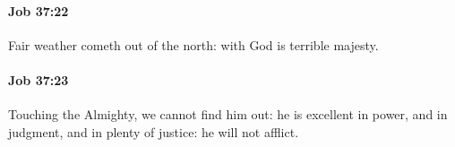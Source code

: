 		\paragraph{Job 37:22} %
			\label{JOB-37-22}

			Fair weather cometh out of the north: with God is terrible majesty.


		\paragraph{Job 37:23} %
			\label{JOB-37-23}

			Touching the Almighty, we cannot find him out: he is excellent in power, and in judgment, and in plenty of justice: he will not afflict.


